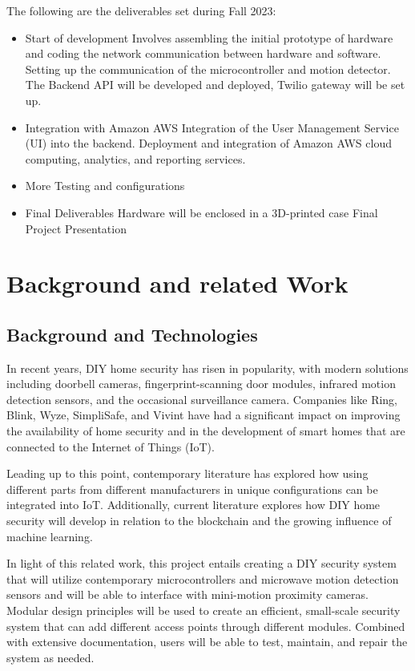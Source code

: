 \documentclass[conference]{IEEEtran}
\begin{document}
The following are the deliverables set during Fall 2023:
\begin{itemize}
      \item Start of development
            \subitem Involves assembling the initial prototype of hardware and coding
            the network communication between hardware and software.
            \subitem Setting up the communication of the microcontroller and motion detector.
            \subitem The Backend API will be developed and deployed, Twilio gateway will be set up.
      \item Integration with Amazon AWS
            \subitem Integration of the User Management Service (UI) into the backend.
            \subitem Deployment and integration of Amazon AWS cloud computing,
            analytics, and reporting services.
      \item More Testing and configurations
      \item Final Deliverables
            \subitem Hardware will be enclosed in a 3D-printed case
            \subitem Final Project Presentation
\end{itemize}

\section{Background and related Work}

\subsection{Background and Technologies}

In recent years, DIY home security has risen in popularity, with modern solutions
including doorbell cameras, fingerprint-scanning door modules, infrared motion detection
sensors, and the occasional surveillance camera. Companies like Ring, Blink, Wyze,
SimpliSafe, and Vivint have had a significant impact on improving the availability of
home security and in the development of smart homes that are connected to the
Internet of Things (IoT).

Leading up to this point, contemporary literature has explored how using different parts
from different manufacturers in unique configurations can be integrated into IoT.\cite{sarhan2020}
Additionally, current literature explores how DIY home security will develop in relation
to the blockchain \cite{arifEtAl_2020} and the growing influence of machine learning.\cite{khanEtAl2021}

In light of this related work, this project entails creating a DIY security system
that will utilize contemporary microcontrollers and microwave motion detection sensors
and will be able to interface with mini-motion proximity cameras. Modular design
principles will be used to create an efficient, small-scale security system that can add
different access points through different modules. Combined with extensive documentation,
users will be able to test, maintain, and repair the system as needed.
\end{document}
